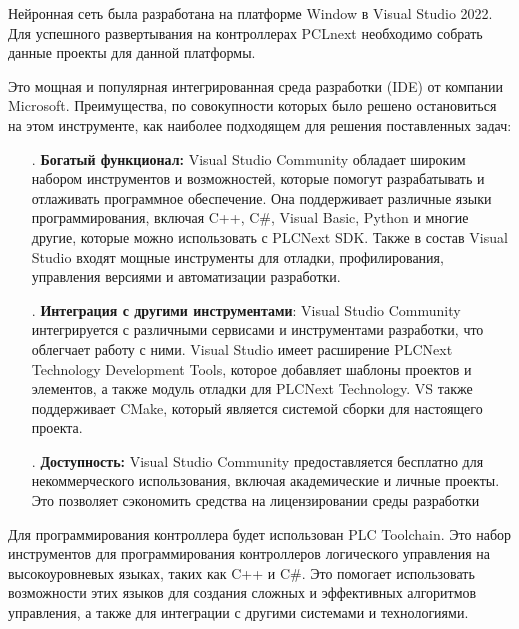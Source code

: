 \subtitlespace

{\gostFont
	
	\par \redline Нейронная сеть была разработана на платформе Window в Visual Studio 2022. Для успешного развертывания на контроллерах PCLnext необходимо собрать данные проекты для данной платформы.
	
	\par \redline Это мощная и популярная интегрированная среда разработки (IDE) от компании Microsoft. Преимущества, по совокупности которых было решено остановиться на этом инструменте, как наиболее подходящем для решения поставленных задач:
	
	\begin{itemize}[leftmargin=2.15cm, labelwidth=0.65cm, labelsep=0.0cm] 
		
		\item[\theitemcntr. ]	\textbf{Богатый функционал:} Visual Studio Community обладает широким набором инструментов и возможностей, которые помогут разрабатывать и отлаживать программное обеспечение. Она поддерживает различные языки программирования, включая C++, C\#, Visual Basic, Python и многие другие, которые можно использовать с PLCNext SDK. Также в состав Visual Studio входят мощные инструменты для отладки, профилирования, управления версиями и автоматизации разработки.
		\addtocounter{itemcntr}{1}
		
		\item[\theitemcntr. ] 	\textbf{Интеграция с другими инструментами}: Visual Studio Community интегрируется с различными сервисами и инструментами разработки, что облегчает работу с ними. Visual Studio имеет расширение PLCNext Technology Development Tools, которое добавляет шаблоны проектов и элементов, а также модуль отладки для PLCNext Technology. VS также поддерживает CMake, который является системой сборки для настоящего проекта.
		
		\addtocounter{itemcntr}{1}
		
		\item[\theitemcntr. ] 	\textbf{Доступность:} Visual Studio Community предоставляется бесплатно для некоммерческого использования, включая академические и личные проекты. Это позволяет сэкономить средства на лицензировании среды разработки
		
		\addtocounter{itemcntr}{1}
		
		\setcounter{itemcntr}{1}
	\end{itemize} 	
	
	\par \redline Для программирования контроллера будет использован PLC Toolchain. Это набор инструментов для программирования контроллеров логического управления на высокоуровневых языках, таких как C++ и C\#. Это помогает использовать возможности этих языков для создания сложных и эффективных алгоритмов управления, а также для интеграции с другими системами и технологиями.
	
}
